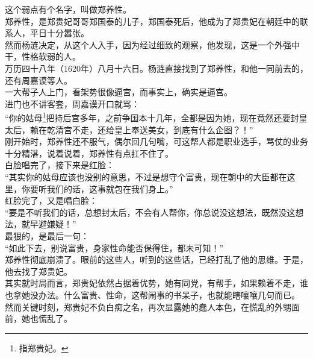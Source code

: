\begin{multicols}{\theparacolNo}
这个弱点有个名字，叫做郑养性。\\

郑养性，是郑贵妃哥哥郑国泰的儿子，郑国泰死后，他成为了郑贵妃在朝廷中的联系人，平日十分嚣张。\\

然而杨涟决定，从这个人入手，因为经过细致的观察，他发现，这是一个外强中干，性格软弱的人。\\

万历四十八年（1620年）八月十六日。杨涟直接找到了郑养性，和他一同前去的，还有周嘉谟等人。\\

一大帮子人上门，看架势很像逼宫，而事实上，确实是逼宫。\\

进门也不讲客套，周嘉谟开口就骂：\\

“你的姑母\footnote{指郑贵妃。}把持后宫多年，之前争国本十几年，全都是因为她，现在竟然还要封皇太后，赖在乾清宫不走，还给皇上奉送美女，到底有什么企图？！”\\

刚开始时，郑养性还不服气，偶尔回几句嘴，可这帮人都是职业选手，骂仗的业务十分精湛，说着说着，郑养性有点扛不住了。\\

白脸唱完了，接下来是红脸：\\

“其实你的姑母应该也没别的意思，不过是想守个富贵，现在朝中的大臣都在这里，你要听我们的话，这事就包在我们身上。”\\

红脸完了，又是唱白脸：\\

“要是不听我们的话，总想封太后，不会有人帮你，你总说没这想法，既然没这想法，就早避嫌疑！”\\

最狠的，是最后一句：\\

“如此下去，别说富贵，身家性命能否保得住，都未可知！”\\

郑养性彻底崩溃了。眼前的这些人，听到的这些话，已经打乱了他的思维。于是，他去找了郑贵妃。\\

其实就时局而言，郑贵妃依然占据着优势，她有同党，有帮手，如果赖着不走，谁也拿她没办法。什么富贵、性命，这帮闹事的书呆子，也就能瞎嚷嚷几句而已。\\

然而关键时刻，郑贵妃不负白痴之名，再次显露她的蠢人本色，在慌乱的外甥面前，她也慌乱了。\\


\end{multicols}
